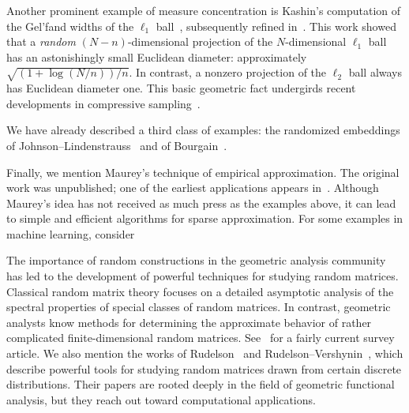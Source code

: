\documentclass[final]{siamltex}
\newcounter{algorithm}[section]
\begin{document}
Another prominent example of measure concentration is Kashin's
computation of the Gel'fand widths of the $\ell_1$
ball~\cite{Kas77:Widths-Certain}, subsequently refined
in~\cite{GG84:Widths-Euclidean}. This work showed that a
\emph{random} $(N - n)$-dimensional projection of the $N$-dimensional
$\ell_1$ ball has an astonishingly small Euclidean diameter:
approximately $\sqrt{(1 + \log(N/n))/n}$.  In contrast, a nonzero projection
of the $\ell_2$ ball always has Euclidean diameter one.
This basic geometric fact undergirds recent developments in
compressive sampling~\cite{Can06:Compressive-Sampling}.

We have already described a third class of examples: the randomized
embeddings of Johnson--Lindenstrauss~\cite{JL84:Extensions-Lipschitz} and
of Bourgain~\cite{Bou85:Lipschitz-Embedding}.

Finally, we mention Maurey's technique of empirical approximation.
The original work was unpublished; one of the earliest applications
appears in~\cite[\S1]{Car85:Inequalities-Bernstein-Jackson}.
Although Maurey's idea has not received as much press as the examples above,
it can lead to simple and efficient algorithms for sparse approximation.
For some examples in machine learning,
consider~\cite{Bar93:Universal-Approximation,LBW96:Efficient-Agnostic,SS08:Low-l1-Norm,RR08:Random-Features}

The importance of random constructions in the geometric analysis
community has led to the development of powerful techniques for
studying random matrices. Classical random matrix theory focuses on
a detailed asymptotic analysis of the spectral properties of special
classes of random matrices.  In contrast, geometric analysts know
methods for determining the approximate behavior of rather complicated
finite-dimensional random matrices. See~\cite{DS02:Local-Operator}
for a fairly current survey article. We also mention
the works of Rudelson~\cite{Rud99:Random-Vectors} and
Rudelson--Vershynin~\cite{RV07:Sampling-Large}, which describe
powerful tools for studying random matrices drawn from certain
discrete distributions.  Their papers are rooted deeply in the field of
geometric functional analysis, but they reach out toward
computational applications.





\end{document}
